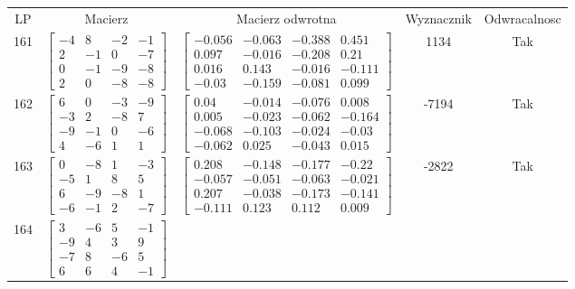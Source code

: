 \documentclass[a4paper,12pt]{article}
\begin{document}
\bgroup {} \vspace{0.2in} \begin{tabular}{c c c c c}
LP & Macierz & Macierz odwrotna & Wyznacznik & Odwracalnosc\\
161
&
$\begin{bmatrix} -4 & 8 & -2 & -1 \\ 2 & -1 & 0 & -7 \\ 0 & -1 & -9 & -8 \\ 2 & 0 & -8 & -8 \end{bmatrix}$
&
$\begin{bmatrix} -0.056 & -0.063 & -0.388 & 0.451 \\ 0.097 & -0.016 & -0.208 & 0.21 \\ 0.016 & 0.143 & -0.016 & -0.111 \\ -0.03 & -0.159 & -0.081 & 0.099 \end{bmatrix}$
&
1134
&
Tak
\\
162
&
$\begin{bmatrix} 6 & 0 & -3 & -9 \\ -3 & 2 & -8 & 7 \\ -9 & -1 & 0 & -6 \\ 4 & -6 & 1 & 1 \end{bmatrix}$
&
$\begin{bmatrix} 0.04 & -0.014 & -0.076 & 0.008 \\ 0.005 & -0.023 & -0.062 & -0.164 \\ -0.068 & -0.103 & -0.024 & -0.03 \\ -0.062 & 0.025 & -0.043 & 0.015 \end{bmatrix}$
&
-7194
&
Tak
\\
163
&
$\begin{bmatrix} 0 & -8 & 1 & -3 \\ -5 & 1 & 8 & 5 \\ 6 & -9 & -8 & 1 \\ -6 & -1 & 2 & -7 \end{bmatrix}$
&
$\begin{bmatrix} 0.208 & -0.148 & -0.177 & -0.22 \\ -0.057 & -0.051 & -0.063 & -0.021 \\ 0.207 & -0.038 & -0.173 & -0.141 \\ -0.111 & 0.123 & 0.112 & 0.009 \end{bmatrix}$
&
-2822
&
Tak
\\
164
&
$\begin{bmatrix} 3 & -6 & 5 & -1 \\ -9 & 4 & 3 & 9 \\ -7 & 8 & -6 & 5 \\ 6 & 6 & 4 & -1 \end{bmatrix}$

\end{tabular}
\end{document}
